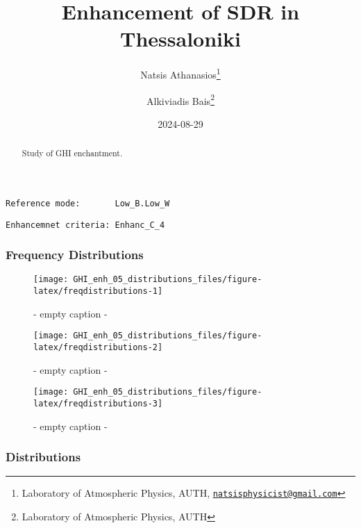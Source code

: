 \documentclass[
  10pt,
  a4paper,oneside]{article}
\title{Enhancement of SDR in Thessaloniki}
\author{Natsis Athanasios\footnote{Laboratory of Atmospheric Physics, AUTH, \href{mailto:natsisphysicist@gmail.com}{\nolinkurl{natsisphysicist@gmail.com}}} \and Alkiviadis Bais\footnote{Laboratory of Atmospheric Physics, AUTH}}
\date{2024-08-29}
\begin{document}
\maketitle
\begin{abstract}
Study of GHI enchantment.
\end{abstract}

{
\hypersetup{linkcolor=}
\setcounter{tocdepth}{4}
\tableofcontents
}
\begin{verbatim}
Reference mode:       Low_B.Low_W 
\end{verbatim}

\begin{verbatim}
Enhancemnet criteria: Enhanc_C_4 
\end{verbatim}

\FloatBarrier

\hypertarget{frequency-distributions}{%
\subsubsection{Frequency Distributions}\label{frequency-distributions}}

\begin{figure}[H]

{\centering \texttt{[image: GHI\_enh\_05\_distributions\_files/figure-latex/freqdistributions-1]} 

}

\caption{ - empty caption - }\label{fig:freqdistributions-1}
\end{figure}
\begin{figure}[H]

{\centering \texttt{[image: GHI\_enh\_05\_distributions\_files/figure-latex/freqdistributions-2]} 

}

\caption{ - empty caption - }\label{fig:freqdistributions-2}
\end{figure}
\begin{figure}[H]

{\centering \texttt{[image: GHI\_enh\_05\_distributions\_files/figure-latex/freqdistributions-3]} 

}

\caption{ - empty caption - }\label{fig:freqdistributions-3}
\end{figure}

\FloatBarrier

\hypertarget{distributions}{%
\subsubsection{Distributions}\label{distributions}}
\end{document}
